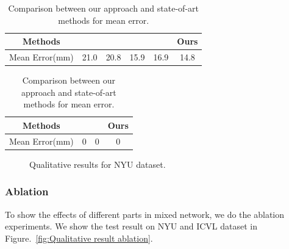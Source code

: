 \documentclass[journal,comsoc]{IEEEtran}
\let\MYoriglatexcaption\caption
\renewcommand{\caption}[2][\relax]{\MYoriglatexcaption[#2]{#2}}
\begin{document}
\begin{table}[htbp]\footnotesize
\centering
    \begin{tabular}{|c|c|c|c|c|c|}
    \hline
    Methods        &\cite{tompson2014real} &\cite{oberweger2015hands} &\cite{oberweger2015training} &\cite{zhou2016model} &Ours\\
    \hline
    Mean Error(mm) &21.0                   &20.8                      &15.9                         &16.9                 &14.8\\
    \hline
\end{tabular}
\vspace{1em}
\caption{Comparison between our approach and state-of-art methods for mean error.}
\label{tab:mean error NYU}
\end{table}

\begin{table}[htbp]\footnotesize
\centering
    \begin{tabular}{|c|c|c|c|}
    \hline
    Methods        &\cite{oberweger2015hands} &\cite{zhou2016model} &Ours\\
    \hline
    Mean Error(mm) &0                      &0                       &0\\
    \hline
    \end{tabular}
\vspace{1em}
\caption{Comparison between our approach and state-of-art methods for mean error.}
\label{tab:mean error ICVL}
\end{table}

\begin{figure}[t]\footnotesize
\centering
    \caption{Qualitative results for NYU dataset.}
    \label{fig:Qualitative result NYU}
\end{figure}
\subsubsection{Ablation}\label{sec:ablation}
To show the effects of different parts in mixed network, we do the ablation experiments. We
show the test result on NYU and ICVL dataset in Figure.~\ref{fig:Qualitative result ablation}.
\end{document}
